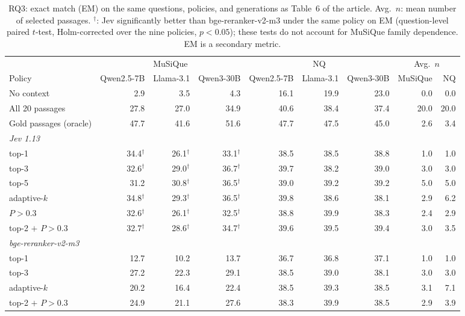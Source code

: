 \begin{table}[t]
\centering
\footnotesize
\setlength{\tabcolsep}{4pt}
\caption{RQ3: exact match (EM) on the same questions, policies, and generations as Table~6 of the article. Avg.\ $n$: mean number of selected passages. $^\dagger$: Jev significantly better than bge-reranker-v2-m3 under the same policy on EM (question-level paired $t$-test, Holm-corrected over the nine policies, $p<0.05$); these tests do not account for MuSiQue family dependence. EM is a secondary metric.}
\label{tab:rag-em}
\begin{tabular}{lrrrrrrrr}
\toprule
 & \multicolumn{3}{c}{MuSiQue} & \multicolumn{3}{c}{NQ} & \multicolumn{2}{c}{Avg.\ $n$} \\
Policy & Qwen2.5-7B & Llama-3.1 & Qwen3-30B & Qwen2.5-7B & Llama-3.1 & Qwen3-30B & MuSiQue & NQ \\
\midrule
No context & 2.9 & 3.5 & 4.3 & 16.1 & 19.9 & 23.0 & 0.0 & 0.0 \\
All 20 passages & 27.8 & 27.0 & 34.9 & 40.6 & 38.4 & 37.4 & 20.0 & 20.0 \\
Gold passages (oracle) & 47.7 & 41.6 & 51.6 & 47.7 & 47.5 & 45.0 & 2.6 & 3.4 \\
\multicolumn{9}{l}{\textit{Jev 1.13}} \\
\quad top-1 & 34.4$^\dagger$ & 26.1$^\dagger$ & 33.1$^\dagger$ & 38.5 & 38.5 & 38.8 & 1.0 & 1.0 \\
\quad top-3 & 32.6$^\dagger$ & 29.0$^\dagger$ & 36.7$^\dagger$ & 39.7 & 38.2 & 39.0 & 3.0 & 3.0 \\
\quad top-5 & 31.2 & 30.8$^\dagger$ & 36.5$^\dagger$ & 39.0 & 39.2 & 39.2 & 5.0 & 5.0 \\
\quad adaptive-$k$ & 34.8$^\dagger$ & 29.3$^\dagger$ & 36.5$^\dagger$ & 39.8 & 38.6 & 38.1 & 2.9 & 6.2 \\
\quad $P>0.3$ & 32.6$^\dagger$ & 26.1$^\dagger$ & 32.5$^\dagger$ & 38.8 & 39.9 & 38.3 & 2.4 & 2.9 \\
\quad top-2 $+$ $P>0.3$ & 32.7$^\dagger$ & 28.6$^\dagger$ & 34.7$^\dagger$ & 39.6 & 39.5 & 39.4 & 3.0 & 3.5 \\
\multicolumn{9}{l}{\textit{bge-reranker-v2-m3}} \\
\quad top-1 & 12.7 & 10.2 & 13.7 & 36.7 & 36.8 & 37.1 & 1.0 & 1.0 \\
\quad top-3 & 27.2 & 22.3 & 29.1 & 38.5 & 39.0 & 38.1 & 3.0 & 3.0 \\
\quad adaptive-$k$ & 20.2 & 16.4 & 22.4 & 38.5 & 39.3 & 38.5 & 3.1 & 7.1 \\
\quad top-2 $+$ $P>0.3$ & 24.9 & 21.1 & 27.6 & 38.3 & 39.9 & 38.5 & 2.9 & 3.9 \\

\end{tabular}
\end{table}
